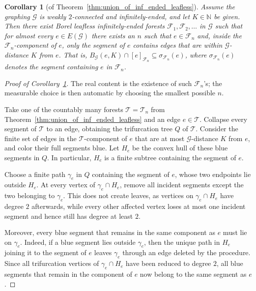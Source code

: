 \documentclass{article}
\theoremstyle{plain}
\newtheorem{cor}[thm]{Corollary}
\theoremstyle{definition}
\newcommand{\N}{\mathbb{N}}
\newcommand{\cG}{\mathcal{G}}
\newcommand{\cF}{\mathcal{F}}
\newcommand{\cT}{\mathcal{T}}
\begin{document}
\begin{cor}[of Theorem~\ref{thm:union_of_inf_ended_leafless}]\label{cor:union_of_inf_ended_leafless_sparsed_laci}
Assume the graphing $\cG$ is weakly $2$-connected and infinitely-ended, and let $K\in\N$ be given. Then there exist Borel leafless infinitely-ended forests  $\cF_1,\cF_2,\dots$ in $\cG$ such that for almost every $e\in E(\cG)$ there exists an $n$ such that $e\in \cF_n$ and, inside the $\cF_n$-component of $e$, only the segment of $e$ contains edges that are within $\cG$-distance $K$ from $e$. That is, $B_{\cG}(e,K) \cap [e]_{\cF_n} \subseteq \sigma_{\cF_n}(e)$, where $\sigma_{\cF_n}(e)$ denotes the segment containing $e$ in $\cF_n$. %
\end{cor}


\begin{proof}[Proof of Corollary~\ref{cor:union_of_inf_ended_leafless_sparsed_laci}]
The real content is the existence of such $\cF_n$'s; the measurable choice is then automatic by choosing the smallest possible $n$.

Take one of the countably many forests $\cT=\cT_n$ from Theorem~\ref{thm:union_of_inf_ended_leafless} and an edge $e\in\cT$. Collapse every segment of $\cT$ to an edge, obtaining the trifurcation tree $Q$ of $\cT$. Consider the finite set of edges in the $\cT$-component of $e$ that are at most $\cG$-distance $K$ from $e$, and color their full segments blue. Let $H_e$ be the convex hull of these blue segments in $Q$. In particular, $H_e$ is a finite subtree containing the segment of $e$.

Choose a finite path $\gamma_e$ in $Q$ containing the segment of $e$, whose two endpoints lie outside $H_e$. At every vertex of $\gamma_e\cap H_e$, remove all incident segments except the two belonging to $\gamma_e$. This does not create leaves, as vertices on $\gamma_e\cap H_e$ have degree $2$ afterwards, while every other affected vertex loses at most one incident segment and hence still has degree at least $2$.

Moreover, every blue segment that remains in the same component as $e$ must lie on $\gamma_e$. Indeed, if a blue segment lies outside $\gamma_e$, then the unique path in $H_e$ joining it to the segment of $e$ leaves $\gamma_e$ through an edge deleted by the procedure. Since all trifurcation vertices of $\gamma_e\cap H_e$ have been reduced to degree $2$, all blue segments that remain in the component of $e$ now belong to the same segment as $e$.


\end{proof}
\end{document}

